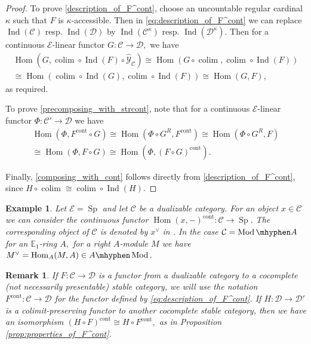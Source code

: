 \documentclass[11pt,leqno]{amsart}
\newtheorem{remark}[theo]{Remark}
\newtheorem{example}[theo]{Example}
\numberwithin{equation}{section}
\def\Hom{\operatorname{Hom}}
\DeclareMathOperator*{\colim}{colim}
\newcommand{\hy}{\mhyphen}
\newcommand{\cont}{\operatorname{cont}}
\newcommand{\bE}{{\mathbb E}}
\newcommand{\cD}{{\mathcal D}}
\newcommand{\cC}{{\mathcal C}}
\newcommand{\cE}{{\mathcal E}}
\newcommand{\cY}{{\mathcal Y}}
\newcommand{\Sp}{\operatorname{Sp}}
\newcommand{\Ind}{\operatorname{Ind}}
\newcommand{\Mod}{\operatorname{Mod}}
\begin{document}
\begin{proof}
To prove \ref{description_of_F^cont}, choose an uncountable regular cardinal $\kappa$ such that $F$ is $\kappa$-accessible. Then in \eqref{eq:description_of_F^cont} we can replace $\Ind(\cC)$ resp. $\Ind(\cD)$ by $\Ind(\cC^{\kappa})$ resp. $\Ind(\cD^{\kappa}).$ Then for a continuous $\cE$-linear functor $G:\cC\to\cD,$ we have
\begin{multline*}
\Hom(G,\colim\circ\Ind(F)\circ\hat{\cY}_{\cC})\cong \Hom(G\circ\colim,\colim\circ\Ind(F))\\
\cong \Hom(\colim\circ\Ind(G),\colim\circ\Ind(F))\cong\Hom(G,F),
\end{multline*}
as required.

To prove \ref{precomposing_with_strcont}, note that for a continuous $\cE$-linear functor $\Phi:\cC'\to\cD$ we have
\begin{multline*}
\Hom(\Phi,F^{\cont}\circ G)\cong \Hom(\Phi\circ G^R,F^{\cont})\cong\Hom(\Phi\circ G^R,F)\\
\cong\Hom(\Phi,F\circ G)\cong \Hom(\Phi,(F\circ G)^{\cont}).
\end{multline*}

Finally, \ref{composing_with_cont} follows directly from \ref{description_of_F^cont}, since $H\circ\colim\cong \colim\circ\Ind(H).$ 
\end{proof}

\begin{example} Let $\cE=\Sp$ and let $\cC$ be a dualizable category. For an object $x\in\cC$ we can consider the continuous functor $\Hom(x,-)^{\cont}:\cC\to\Sp.$ The corresponding object of $\cC$ is denoted by $x^{\vee}$ in \cite{E24}. In the case $\cC=\Mod\hy A$ for an $\bE_1$-ring $A,$ for a right $A$-module $M$ we have $M^{\vee}=\Hom_A(M,A)\in A\hy\Mod.$
\end{example}

\begin{remark}\label{rem:F^cont_for_non_presentable_target}
If $F:\cC\to\cD$ is a functor from a dualizable category to a cocomplete (not necessarily presentable) stable category, we will use the notation $F^{\cont}:\cC\to\cD$ for the functor defined by \eqref{eq:description_of_F^cont}. If $H:\cD\to\cD'$ is a colimit-preserving functor to another cocomplete stable category, then we have an isomorphism $(H\circ F)^{\cont}\cong H\circ F^{\cont},$ as in Proposition \ref{prop:properties_of_F^cont}.
\end{remark}
\end{document}
